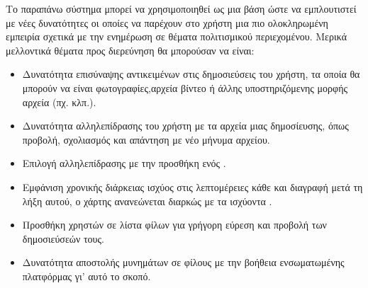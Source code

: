 Το παραπάνω σύστημα μπορεί να χρησιμοποιηθεί ως μια βάση ώστε να
εμπλουτιστεί με νέες δυνατότητες οι οποίες να παρέχουν στο χρήστη μια πιο ολοκληρωμένη εμπειρία σχετικά με την ενημέρωση σε θέματα πολιτισμικού περιεχομένου. Μερικά μελλοντικά θέματα προς διερεύνηση θα μπορούσαν να είναι:

\begin{itemize}
    \item Δυνατότητα επισύναψης  αντικειμένων στις δημοσιεύσεις του χρήστη, τα οποία θα μπορούν να είναι φωτογραφίες,αρχεία βίντεο ή άλλης υποστηριζόμενης μορφής αρχεία (πχ.  κλπ.).
    \item Δυνατότητα αλληλεπίδρασης του χρήστη με τα  αρχεία μιας δημοσίευσης, όπως προβολή, σχολιασμός και απάντηση με νέο μήνυμα αρχείου.
    \item Επιλογή αλληλεπίδρασης με την προσθήκη ενός .
    \item Εμφάνιση χρονικής διάρκειας ισχύος στις λεπτομέρειες κάθε  και διαγραφή μετά τη λήξη αυτού, ο χάρτης ανανεώνεται διαρκώς με τα ισχύοντα .
    \item Προσθήκη χρηστών σε λίστα φίλων για γρήγορη εύρεση και προβολή των δημοσιεύσεών τους.
    \item Δυνατότητα αποστολής μυνημάτων σε φίλους με την βοήθεια ενσωματωμένης πλατφόρμας γι' αυτό το σκοπό.
\end{itemize}

